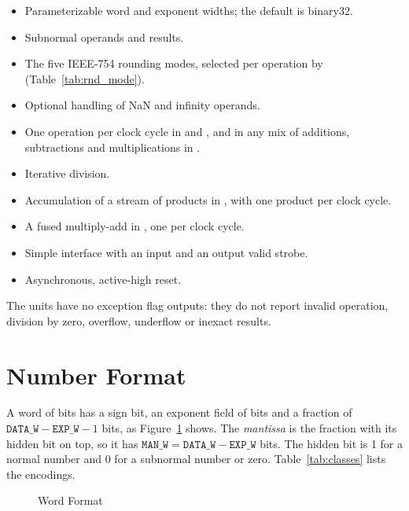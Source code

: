 \begin{itemize}
\item Parameterizable word and exponent widths; the default is binary32.
\item Subnormal operands and results.
\item The five IEEE-754 rounding modes, selected per operation by 
  (Table~\ref{tab:rnd_mode}).
\item Optional handling of NaN and infinity operands.
\item One operation per clock cycle in  and , and in any mix
  of additions, subtractions and multiplications in .
\item Iterative division.
\item Accumulation of a stream of products in , with one product per
  clock cycle.
\item A fused multiply-add in , one per clock cycle.
\item Simple interface with an input and an output valid strobe.
\item Asynchronous, active-high reset.
\end{itemize}

The units have no exception flag outputs: they do not report invalid operation,
division by zero, overflow, underflow or inexact results.

\section{Number Format}
\label{sec:format}

A word of  bits has a sign bit, an exponent field of 
bits and a fraction of $\mathtt{DATA\_W}-\mathtt{EXP\_W}-1$ bits, as
Figure~\ref{fig:format} shows. The \emph{mantissa} is the fraction with its
hidden bit on top, so it has $\mathtt{MAN\_W}=\mathtt{DATA\_W}-\mathtt{EXP\_W}$
bits. The hidden bit is 1 for a normal number and 0 for a subnormal number or
zero. Table~\ref{tab:classes} lists the encodings.

\begin{figure}[H]
\centering
{}
\caption{Word Format}
\label{fig:format}
\end{figure}

